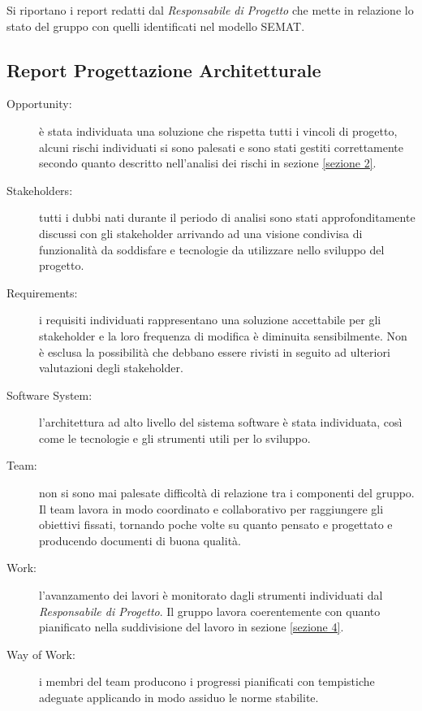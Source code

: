 Si riportano i report redatti dal \textit{Responsabile di Progetto} che mette in relazione lo stato del gruppo con quelli identificati nel modello SEMAT.

\subsection{Report Progettazione Architetturale}
\begin{description}
	\item[Opportunity:] è stata individuata una soluzione che rispetta tutti i vincoli di progetto, alcuni rischi individuati si sono palesati e sono stati gestiti correttamente secondo quanto descritto nell'analisi dei rischi in sezione \ref{sezione 2}.
	\item[Stakeholders:] tutti i dubbi nati durante il periodo di analisi sono stati approfonditamente discussi con gli stakeholder arrivando ad una visione condivisa di funzionalità da soddisfare e tecnologie da utilizzare nello sviluppo del progetto.
	\item[Requirements:] i requisiti individuati rappresentano una soluzione accettabile per gli stakeholder e la loro frequenza di modifica è diminuita sensibilmente. Non è esclusa la possibilità che debbano essere rivisti in seguito ad ulteriori valutazioni degli stakeholder. 
	\item[Software System:] l'architettura ad alto livello del sistema software è stata individuata, così come le tecnologie e gli strumenti utili per lo sviluppo.
	\item[Team:] non si sono mai palesate difficoltà di relazione tra i componenti del gruppo. Il team lavora in modo coordinato e collaborativo per raggiungere gli obiettivi fissati, tornando poche volte su quanto pensato e progettato e producendo documenti di buona qualità.
	\item[Work:] l'avanzamento dei lavori è monitorato dagli strumenti individuati dal \textit{Responsabile di Progetto}. Il gruppo lavora coerentemente con quanto pianificato nella suddivisione del lavoro in sezione \ref{sezione 4}.
	\item[Way of Work:] i membri del team producono i progressi pianificati con tempistiche adeguate applicando in modo assiduo le norme stabilite. 
\end{description}
